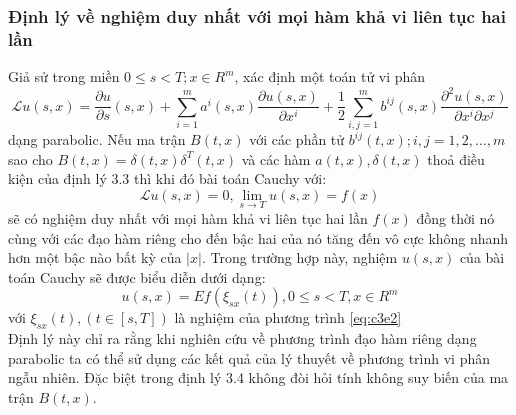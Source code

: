 \documentclass[a4paper]{article}
\numberwithin{equation}{section}
\begin{document}
\subsubsection{Định lý về nghiệm duy nhất với mọi hàm khả vi liên tục hai lần}
Giả sử trong miền $0\leq s<T;x\in R^m$, xác định một toán tử vi phân
\begin{equation*}
	\mathscr{L}u(s,x)=\dfrac{\partial u}{\partial s}(s,x)+\sum_{i=1}^{m}a^i(s,x)\dfrac{\partial u(s,x)}{\partial x^i}+\dfrac{1}{2}\sum_{i,j=1}^{m}b^{ij}(s,x)\dfrac{\partial^2u(s,x)}{\partial x^i\partial x^j}
\end{equation*}
dạng parabolic. Nếu ma trận $B(t,x)$ với các phần tử $b^{ij}(t,x);i,j=1,2,...,m$ sao cho $B(t,x)=\delta(t,x)\delta^T(t,x)$ và các hàm $a(t,x),\delta(t,x)$ thoả điều kiện của định lý 3.3 thì khi đó bài toán Cauchy với:
\begin{equation*}
	\mathscr{L}u(s,x)=0,\lim\limits_{s\rightarrow T}u(s,x)=f(x)
\end{equation*} 
sẽ có nghiệm duy nhất với mọi hàm khả vi liên tục hai lần $f(x)$ đồng thời nó cùng với các đạo hàm riêng cho đến bậc hai của nó tăng đến vô cực không nhanh hơn một bậc nào bất kỳ của $|x|$. Trong trường hợp này, nghiệm $u(s,x)$ của bài toán Cauchy sẽ được biểu diễn dưới dạng:
\begin{equation*}
	u(s,x)=Ef(\xi_{sx}(t)),0\leq s<T,x\in R^m
\end{equation*}
với $\xi_{sx}(t),(t\in[s,T])$ là nghiệm của phương trình \eqref{eq:c3e2}\\
Định lý này chỉ ra rằng khi nghiên cứu về phương trình đạo hàm riêng dạng parabolic ta có thể sử dụng các kết quả của lý thuyết về phương trình vi phân ngẫu nhiên. Đặc biệt trong định lý 3.4 không đòi hỏi tính không suy biến của ma trận $B(t,x)$.\\
\end{document}
